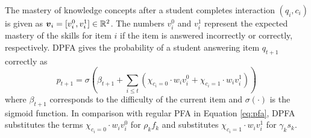 The mastery of knowledge concepts after a student completes interaction $(q_i, c_i)$ is given as $\boldsymbol{v}_i = [v_i^0, v_i^1] \in \mathbb{R}^2$. The numbers $v_i^0$ and $v_i^1$ represent the expected mastery of the skills for item $i$ if the item is answered incorrectly or correctly, respectively. DPFA gives the probability of a student answering item $q_{t+1}$ correctly as
\begin{equation}
  p_{t+1} = \sigma\left( \beta_{t+1} + \sum_{i \leq t} \left( \chi_{c_i=0}\cdot w_i v_i^0 + \chi_{c_i=1} \cdot w_i v_i^1 \right) \right)
  \label{eq:dpfa}
\end{equation}
where $\beta_{t+1}$ corresponds to the difficulty of the current item and $\sigma(\cdot)$ is the sigmoid function. In comparison with regular PFA in Equation \ref{eq:pfa}, DPFA substitutes the terms $\chi_{c_i=0}\cdot w_i v_i^0$ for $\rho_k f_k$ and substitutes $\chi_{c_i=1} \cdot w_i v_i^1$ for $\gamma_k s_k$.

